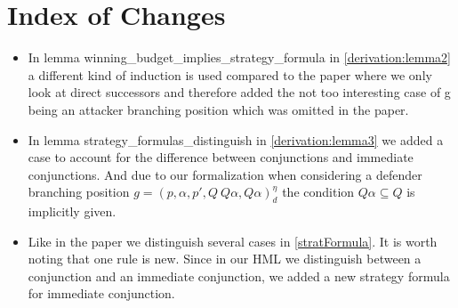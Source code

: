 \section{Index of Changes}

\begin{itemize}
    \item  In lemma winning\_budget\_implies\_strategy\_formula in \ref{derivation:lemma2} a different kind of induction is used compared to the paper 
    where we only look at direct successors and therefore added the not too interesting case of g being an 
    attacker branching position which was omitted in the paper.
   \item In lemma strategy\_formulas\_distinguish in  \ref{derivation:lemma3} we added a case to account for the difference between 
conjunctions and immediate conjunctions. And due to our formalization when considering a
defender branching position $g=(p,\alpha ,p', Q \ Q\alpha, Q\alpha)_d^\eta$ the condition 
$Q \alpha \subseteq Q$ is implicitly given.
  \item Like in the paper we distinguish several cases in \ref{stratFormula}. It is worth noting that one rule is new.
Since in our HML we distinguish between a conjunction and an immediate conjunction, we added a new strategy formula for immediate conjunction.
\end{itemize}
